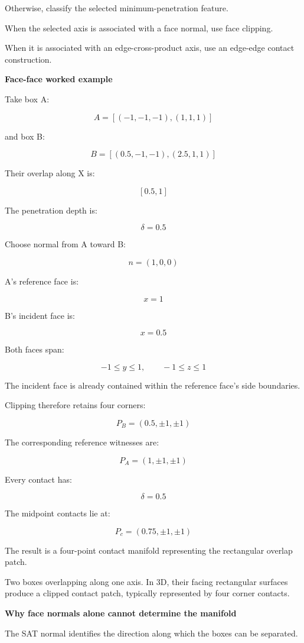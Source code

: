 Otherwise, classify the selected minimum-penetration feature.

When the selected axis is associated with a face normal, use face clipping.

When it is associated with an edge-cross-product axis, use an edge-edge contact construction.

\textbf{Face-face worked example}

Take box A:

\[
A=[(-1,-1,-1),(1,1,1)]
\]

and box B:

\[
B=[(0.5,-1,-1),(2.5,1,1)]
\]

Their overlap along X is:

\[
[0.5,1]
\]

The penetration depth is:

\[
\delta=0.5
\]

Choose normal from A toward B:

\[
n=(1,0,0)
\]

A's reference face is:

\[
x=1
\]

B's incident face is:

\[
x=0.5
\]

Both faces span:

\[
-1\le y\le1,\qquad-1\le z\le1
\]

The incident face is already contained within the reference face's side boundaries.

Clipping therefore retains four corners:

\[
P_B=(0.5,\pm1,\pm1)
\]

The corresponding reference witnesses are:

\[
P_A=(1,\pm1,\pm1)
\]

Every contact has:

\[
\delta=0.5
\]

The midpoint contacts lie at:

\[
\boxed{ P_c=(0.75,\pm1,\pm1) }
\]

The result is a four-point contact manifold representing the rectangular overlap patch.

Two boxes overlapping along one axis. In 3D, their facing rectangular surfaces produce a clipped contact patch, typically represented by four corner contacts.

\textbf{Why face normals alone cannot determine the manifold}

The SAT normal identifies the direction along which the boxes can be separated.

